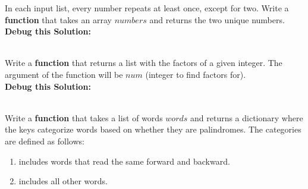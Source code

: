\pagebreak



	\item 	
		In each input list, every number repeats at least once, except for two. Write a \textbf{function} 
		that takes an array $numbers$ and returns the two unique numbers.\\

		\textbf{Debug this Solution:}\\
		\mbox{ \hspace*{0.25in}	}

\pagebreak



	\item 
		Write a \textbf{function} that returns a list with the factors of a given integer. 
		The argument of the function will be $num$ (integer to find factors for).\\

		\textbf{Debug this Solution:}\\
		\mbox{ \hspace*{0.25in}	}

\pagebreak




\item
	Write a \textbf{function} that takes a list of words $words$ and returns a dictionary where 
	the keys categorize words based on whether they are palindromes. 
	The categories are defined as follows:
	\begin{enumerate}  
		\item {} includes words that read the same forward and backward.  
		\item {} includes all other words.  
	\end{enumerate}  

